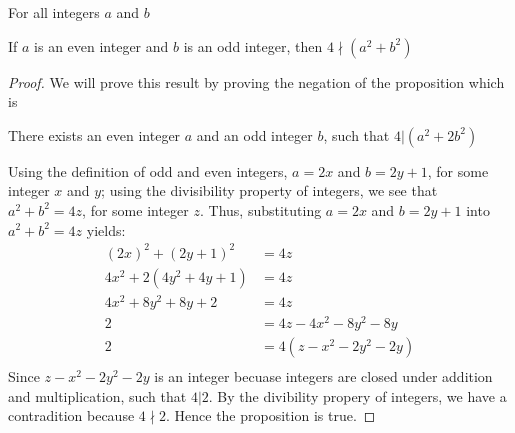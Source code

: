 \newpage
\begin{example}
For all integers $a$ and $b$
\begin{tcolorbox}
	\begin{theorem}
	\label{the2}		
		If $a$ is an even integer and $b$ is an odd integer, then $4 \nmid (a^2 + b^2)$ 
	\end{theorem}
\end{tcolorbox}

\begin{proof}
    We will prove this result by proving the negation of the proposition which is
    	\begin{center}
    		There exists an even integer $a$ and an odd integer $b$, such that $4 | (a^2 + 2b^2)$
    	\end{center}
    
    Using the definition of odd and even integers, $a = 2x$ and $b = 2y + 1$, for some integer $x$ and $y$; using the divisibility property of integers, we see that $a^2 + b^2 = 4z$, for some integer $z$. Thus, substituting $a = 2x$ and $b = 2y + 1$ into $a^2 + b^2 = 4z$ yields: 
        \begin{align*}
            (2x)^2 + (2y + 1)^2 & = 4z \\
            4x^2 + 2(4y^2 + 4y + 1) & = 4z \\
            4x^2 + 8y^2 + 8y + 2 & = 4z \\
            2 & = 4z - 4x^2 - 8y^2 - 8y  \\
            2 & = 4(z - x^2 - 2y^2 - 2y) \\
        \end{align*}
    Since $z - x^2 - 2y^2 - 2y$ is an integer becuase integers are closed under addition and multiplication, such that $4 | 2$. By the divibility propery of integers, we have a contradition because $4 \nmid 2$. Hence the proposition is true. 
\end{proof}
\end{example}



